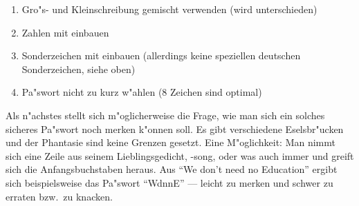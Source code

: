 \begin{enumerate}
  \item Gro"s- und Kleinschreibung gemischt verwenden (wird unterschieden)
  \item Zahlen mit einbauen
  \item Sonderzeichen mit einbauen (allerdings keine speziellen deutschen
    Sonderzeichen, siehe oben)
  \item Pa"swort nicht zu kurz w"ahlen (8 Zeichen sind optimal) 
\end{enumerate}

Als n"achstes stellt sich m"oglicherweise die Frage, wie man sich ein solches
sicheres Pa"swort noch merken k"onnen soll. Es gibt verschiedene Eselsbr"ucken
und der Phantasie sind keine Grenzen gesetzt. Eine M"oglichkeit: Man nimmt sich
eine Zeile aus seinem Lieblingsgedicht, -song, oder was auch immer und greift
sich die Anfangsbuchstaben heraus. Aus "`We don't need no Education"' ergibt
sich beispielsweise das Pa"swort "`WdnnE"' --- leicht zu merken und schwer zu
erraten bzw.\  zu knacken.
